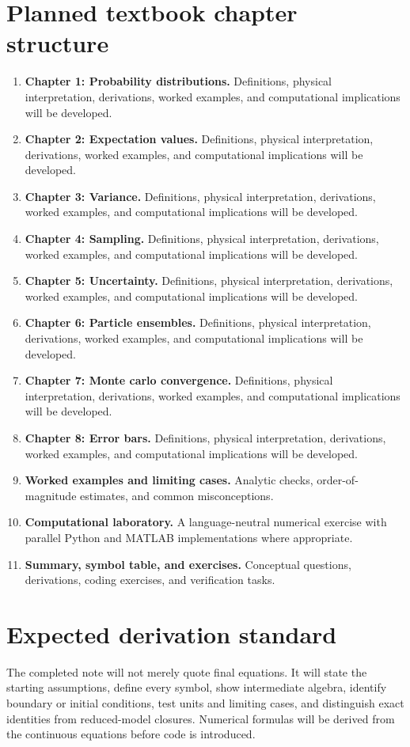 \documentclass[11pt]{article}
\begin{document}
\section{Planned textbook chapter structure}
\begin{enumerate}[leftmargin=1.8em]
\item \textbf{Chapter 1: Probability distributions.} Definitions, physical interpretation, derivations, worked examples, and computational implications will be developed.
\item \textbf{Chapter 2: Expectation values.} Definitions, physical interpretation, derivations, worked examples, and computational implications will be developed.
\item \textbf{Chapter 3: Variance.} Definitions, physical interpretation, derivations, worked examples, and computational implications will be developed.
\item \textbf{Chapter 4: Sampling.} Definitions, physical interpretation, derivations, worked examples, and computational implications will be developed.
\item \textbf{Chapter 5: Uncertainty.} Definitions, physical interpretation, derivations, worked examples, and computational implications will be developed.
\item \textbf{Chapter 6: Particle ensembles.} Definitions, physical interpretation, derivations, worked examples, and computational implications will be developed.
\item \textbf{Chapter 7: Monte carlo convergence.} Definitions, physical interpretation, derivations, worked examples, and computational implications will be developed.
\item \textbf{Chapter 8: Error bars.} Definitions, physical interpretation, derivations, worked examples, and computational implications will be developed.
\item \textbf{Worked examples and limiting cases.} Analytic checks, order-of-magnitude estimates, and common misconceptions.
\item \textbf{Computational laboratory.} A language-neutral numerical exercise with parallel Python and MATLAB implementations where appropriate.
\item \textbf{Summary, symbol table, and exercises.} Conceptual questions, derivations, coding exercises, and verification tasks.
\end{enumerate}

\section{Expected derivation standard}
The completed note will not merely quote final equations. It will state the starting assumptions, define every symbol, show intermediate algebra, identify boundary or initial conditions, test units and limiting cases, and distinguish exact identities from reduced-model closures. Numerical formulas will be derived from the continuous equations before code is introduced.
\end{document}
